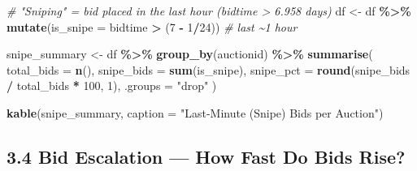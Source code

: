 \documentclass[
]{article}
\newenvironment{Shaded}{\begin{snugshade}}{\end{snugshade}}
\newcommand{\AttributeTok}[1]{\textcolor[rgb]{0.13,0.29,0.53}{#1}}
\newcommand{\CommentTok}[1]{\textcolor[rgb]{0.56,0.35,0.01}{\textit{#1}}}
\newcommand{\DecValTok}[1]{\textcolor[rgb]{0.00,0.00,0.81}{#1}}
\newcommand{\FunctionTok}[1]{\textcolor[rgb]{0.13,0.29,0.53}{\textbf{#1}}}
\newcommand{\NormalTok}[1]{#1}
\newcommand{\OtherTok}[1]{\textcolor[rgb]{0.56,0.35,0.01}{#1}}
\newcommand{\SpecialCharTok}[1]{\textcolor[rgb]{0.81,0.36,0.00}{\textbf{#1}}}
\newcommand{\StringTok}[1]{\textcolor[rgb]{0.31,0.60,0.02}{#1}}
\begin{document}
\begin{Shaded}
\begin{Highlighting}[]
\CommentTok{\# "Sniping" = bid placed in the last hour (bidtime \textgreater{} 6.958 days)}
\NormalTok{df }\OtherTok{\textless{}{-}}\NormalTok{ df }\SpecialCharTok{\%\textgreater{}\%}
  \FunctionTok{mutate}\NormalTok{(}\AttributeTok{is\_snipe =}\NormalTok{ bidtime }\SpecialCharTok{\textgreater{}}\NormalTok{ (}\DecValTok{7} \SpecialCharTok{{-}} \DecValTok{1}\SpecialCharTok{/}\DecValTok{24}\NormalTok{))  }\CommentTok{\# last \textasciitilde{}1 hour}

\NormalTok{snipe\_summary }\OtherTok{\textless{}{-}}\NormalTok{ df }\SpecialCharTok{\%\textgreater{}\%}
  \FunctionTok{group\_by}\NormalTok{(auctionid) }\SpecialCharTok{\%\textgreater{}\%}
  \FunctionTok{summarise}\NormalTok{(}
    \AttributeTok{total\_bids  =} \FunctionTok{n}\NormalTok{(),}
    \AttributeTok{snipe\_bids  =} \FunctionTok{sum}\NormalTok{(is\_snipe),}
    \AttributeTok{snipe\_pct   =} \FunctionTok{round}\NormalTok{(snipe\_bids }\SpecialCharTok{/}\NormalTok{ total\_bids }\SpecialCharTok{*} \DecValTok{100}\NormalTok{, }\DecValTok{1}\NormalTok{),}
    \AttributeTok{.groups     =} \StringTok{"drop"}
\NormalTok{  )}

\FunctionTok{kable}\NormalTok{(snipe\_summary, }\AttributeTok{caption =} \StringTok{"Last{-}Minute (Snipe) Bids per Auction"}\NormalTok{)}
\end{Highlighting}
\end{Shaded}

\subsection{3.4 Bid Escalation --- How Fast Do Bids
Rise?}\label{bid-escalation-how-fast-do-bids-rise}
\end{document}
